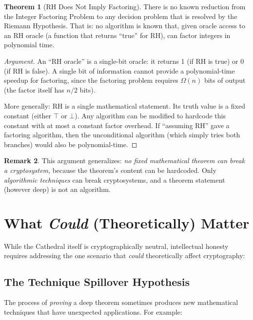 \documentclass[11pt,a4paper]{article}
\theoremstyle{definition}
\newtheorem{theorem}{Theorem}[section]
\newtheorem{remark}[theorem]{Remark}
\theoremstyle{plain}
\newcommand{\RH}{\ensuremath{\mathrm{RH}}}
\begin{document}
\begin{theorem}[RH Does Not Imply Factoring]
\label{thm:separation}
There is no known reduction from the Integer Factoring Problem to
any decision problem that is resolved by the Riemann Hypothesis.
That is: no algorithm is known that, given oracle access to an
RH oracle (a function that returns ``true'' for $\RH$), can factor
integers in polynomial time.
\end{theorem}

\begin{proof}[Argument]
An ``RH oracle'' is a single-bit oracle: it returns 1 (if RH is
true) or 0 (if RH is false). A single bit of information cannot
provide a polynomial-time speedup for factoring, since the factoring
problem requires $\Omega(n)$ bits of output (the factor itself has
$n/2$ bits).

More generally: RH is a single mathematical statement. Its truth
value is a fixed constant (either $\top$ or $\bot$). Any algorithm
can be modified to hardcode this constant with at most a constant
factor overhead. If ``assuming RH'' gave a factoring algorithm, then
the unconditional algorithm (which simply tries both branches)
would also be polynomial-time.
\end{proof}

\begin{remark}
This argument generalizes: \emph{no fixed mathematical theorem can
break a cryptosystem}, because the theorem's content can be
hardcoded. Only \emph{algorithmic techniques} can break
cryptosystems, and a theorem statement (however deep) is not an
algorithm.
\end{remark}

\section{What \emph{Could} (Theoretically) Matter}
\label{sec:could}

While the Cathedral itself is cryptographically neutral, intellectual
honesty requires addressing the one scenario that \emph{could}
theoretically affect cryptography:

\subsection{The Technique Spillover Hypothesis}

The process of \emph{proving} a deep theorem sometimes produces new
mathematical techniques that have unexpected applications. For example:
\end{document}
